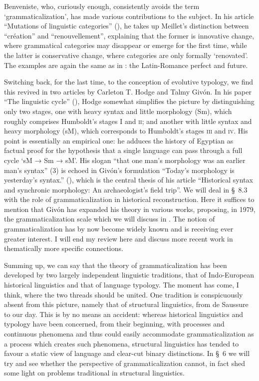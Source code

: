 Benveniste, who, curiously enough, consistently avoids the term ‘grammaticalization’, has made various contributions to the subject. In his article “Mutations of linguistic categories” (\citeyear{Benveniste1968}), he takes up Meillet's distinction between “création” and “renouvellement”, explaining that the former is innovative change, where grammatical categories may disappear or emerge for the first time, while the latter is conservative change, where categories are only formally ‘renovated’. The examples are again the same as in \citet{Meillet1912}: the Latin-Romance perfect and future.

Switching back, for the last time, to the conception of evolutive typology, we find this revived in two articles by Carleton T. Hodge and Talmy Givón. In his paper “The linguistic cycle” (\citeyear{Hodge1970}), Hodge somewhat simplifies the picture by distinguishing only two stages, one with heavy syntax and little morphology (Sm), which roughly comprises Humboldt's stages I and \textsc{ii}; and another with little syntax and heavy morphology (sM), which corresponds to Humboldt's stages \textsc{iii} and \textsc{iv}. His point is essentially an empirical one: he adduces the history of Egyptian as factual proof for the hypothesis that a single language can pass through a full cycle ‘sM → Sm → sM’. His slogan “that one man's morphology was an earlier man's syntax” (3) is echoed in Givón's formulation “Today's morphology is yesterday's syntax.” (\citeyear[413]{Givón1971}), which is the central thesis of his article “Historical syntax and synchronic morphology: An archaeologist's field trip”. We will deal in §~8.3 with the role of grammaticalization in historical reconstruction. Here it suffices to mention that Givón has expanded his theory in various works, proposing, in 1979, the grammaticalization scale which we will discuss in . The notion of grammaticalization has by now become widely known and is receiving ever greater interest. I will end my review here and discuss more recent work in thematically more specific connections.

Summing up, we can say that the theory of grammaticalization has been developed by two largely independent linguistic traditions, that of Indo-European historical linguistics and that of language typology. The moment has come, I think, where the two threads should be united. One tradition is conspicuously absent from this picture, namely that of structural linguistics, from de Saussure to our day. This is by no means an accident: whereas historical linguistics and typology have been concerned, from their beginning, with processes and continuous phenomena and thus could easily accommodate grammaticalization as a process which creates such phenomena, structural linguistics has tended to favour a static view of language and clear-cut binary distinctions. In §~6 we will try and see whether the perspective of grammaticalization cannot, in fact shed some light on problems traditional in structural linguistics.
